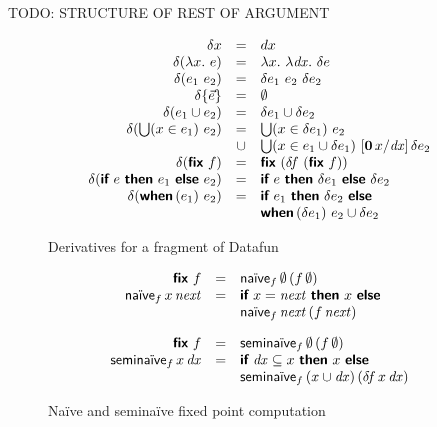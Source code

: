 \documentclass[sigplan,screen,review,timestamp,dvipsnames]{acmart}
\newcommand{\todo}[1]{{\color{ACMPurple}#1}}
\newcommand{\naive}{na\"ive}
\newcommand{\D}{\Delta}
\newcommand{\fn}{\lambda}
\newcommand{\binder}{.~}
\newcommand{\bind}[1]{#1\binder}
\newcommand{\fnof}[1]{\fn\bind{#1}}
\renewcommand{\d}{\delta}
\newcommand{\zero}{\mathbf{0}}
\newcommand{\kw}[1]{\textsf{\bfseries #1}}
\newcommand{\tlv}[1]{\textsf{#1}}
\newcommand{\var}[1]{\mathit{#1}}
\newcommand{\dee}[1]{\var{d#1}}
\newcommand{\subst}[1]{[#1]\,}
\newcommand{\mto}{\overset{+}{\to}}
\renewcommand{\mto}{\Rightarrow}
\newcommand{\eset}[1]{\{#1\}}
\newcommand{\ewhen}[1]{\kw{when}\,(#1)~}
\newcommand{\eif}[2]{\kw{if}~#1~\kw{then}~#2~\kw{else}~}
\newcommand{\efor}[1]{\bigcup(#1)~}
\newcommand{\elet}[1]{\kw{let}~#1~\kw{in}~}
\newcommand{\efix}{\kw{fix}~}
\begin{document}
\todo{TODO: STRUCTURE OF REST OF ARGUMENT}



\begin{figure}
  \[\begin{array}{rcl}
    \d x &=& dx\\
    \d(\fnof x e) &=& \fnof x \fnof{\dee x} \d{e}\\
    \d(e_1~e_2) &=& \d{e_1}~e_2~\d{e_2}\\
    \d{\eset{\vec e}} &=& \emptyset\\
    \d(e_1 \cup e_2) &=& \d{e_1} \cup \d{e_2}\\
    \d(\efor{x \in e_1} e_2)
    &=& \efor{x \in \d{e_1}} e_2\\
    &\cup& \efor{x \in e_1 \cup \d{e_1}}
    \subst{\zero\, x / \dee x}
    \d{e_2}
    \\
    \d(\efix f) &=& \efix (\d\!f~(\efix f))\\
    \d(\eif{e}{e_1}{e_2}) &=& \eif{e}{\d{e_1}}{\d{e_2}}\\
    \d(\ewhen{e_1}{e_2})
    &=& \eif{e_1}{\d{e_2}}\\
    && \ewhen{\d{e_1}} {e_2 \cup \d{e_2}}
  \end{array}\]
  \vspace{-.8em}
  \caption{Derivatives for a fragment of Datafun}
  \label{fig:derivatives}
\end{figure}

\begin{figure}
  \[
  \begin{array}{rcl}
  \efix f &=& \tlv{\naive}_f \,\emptyset \,(f\, \emptyset)\\
  \tlv{\naive}_f \,x \,\var{next}
  &=& \kw{if}~ x = \var{next} ~\kw{then}~ x ~\kw{else}\\
  && \tlv{\naive}_f \,\var{next} \,(f \,\var{next})

  \vspace{1em}\\

  \efix f &=& \tlv{semi\naive}_f \,\emptyset \,(f\, \emptyset)\\
  \tlv{semi\naive}_f \,x \,\dee x
  &=& \kw{if}~ \dee x \subseteq x ~\kw{then}~ x ~\kw{else}\\
  && \tlv{semi\naive}_f \,(x \cup \dee x) \,(\d\!f \,x \,\dee x)
  \end{array}
  \]
  \vspace{-.5em}
  \caption{Na\"ive and semina\"ive fixed point computation}
  \label{fig:defining-fix}
\end{figure}
\end{document}
